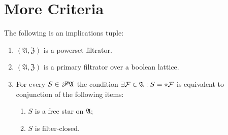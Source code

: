 \section{More Criteria}
\begin{thm}
\label{closed-free-star}The following is an implications tuple:
\begin{enumerate}
\item \label{closed-free-star-p}$(\mathfrak{A},\mathfrak{Z})$ is a powerset
filtrator.
\item \label{closed-free-star-fltr}$(\mathfrak{A},\mathfrak{Z})$ is a
primary filtrator over a boolean lattice.
\item \label{closed-free-star-conc}For every $S\in\mathscr{P}\mathfrak{A}$
the condition $\exists\mathcal{F}\in\mathfrak{A}:S=\star\mathcal{F}$
is equivalent to conjunction of the following items:

\begin{enumerate}
\item \label{fs-star}$S$ is a free star on $\mathfrak{A}$;
\item \label{fs-fclos}$S$ is filter-closed.
\end{enumerate}
\end{enumerate}
\end{thm}
